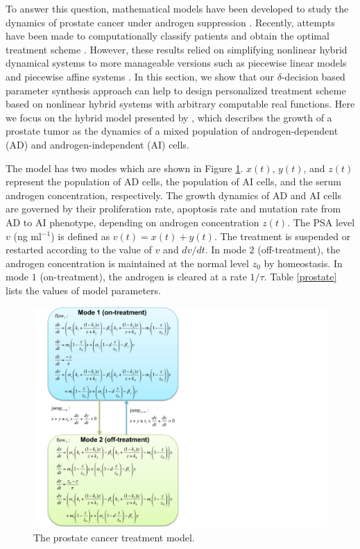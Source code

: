 To answer this question, mathematical models have been developed to study the dynamics of prostate cancer under androgen suppression \citep{jackson04,ideta08, hirata10,pnas11}. Recently, attempts have been made to computationally classify patients and obtain the optimal treatment scheme \citep{chaos10,suzuki10}. However, these results relied on simplifying nonlinear hybrid dynamical systems to more manageable versions such as piecewise linear models \citep{chaos10} and piecewise affine systems \citep{suzuki10}. In this section, we show that our $\delta$-decision based parameter synthesis approach can help to design personalized treatment scheme based on nonlinear hybrid systems with arbitrary computable real functions. Here we focus on the hybrid model presented by \cite{ideta08}, which describes the growth of a prostate tumor as the dynamics of a mixed population of androgen-dependent (AD) and androgen-independent (AI) cells.

The model has two modes which are shown in Figure \ref{pmodel}. $x(t)$, $y(t)$, and $z(t)$ represent the population of AD cells, the population of AI cells, and the serum androgen concentration, respectively. The growth dynamics of AD and AI cells are governed by their proliferation rate, apoptosis rate and mutation rate from AD to AI phenotype, depending on androgen concentration $z(t)$. The PSA level $v$ (ng ml$^{-1}$) is defined as $v(t)=x(t)+y(t)$. The treatment is suspended or restarted according to the value of $v$ and ${dv}/{dt}$. In mode $2$ (off-treatment), the androgen concentration is maintained at the normal level $z_0$ by homeostasis. In mode $1$ (on-treatment), the androgen is cleared at a rate $1/\tau$. Table \ref{prostate} lists the values of model parameters.

\begin{figure}[htb]
\centering
\includegraphics[scale=0.5]{fig-prostate}
\caption{The prostate cancer treatment model.}
\label{pmodel}
\end{figure}

